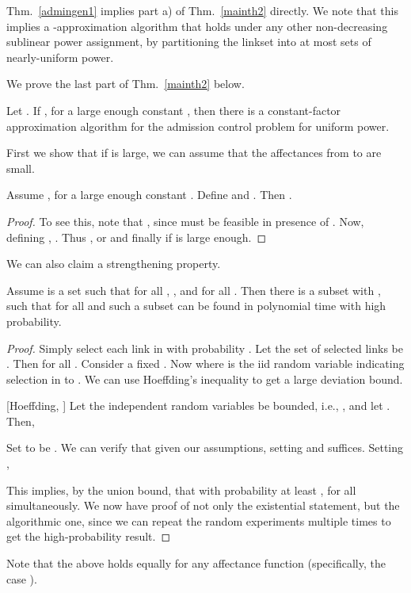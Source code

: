 \documentclass[11pt]{amsart}
\begin{document}
Thm.~\ref{admingen1} implies part a) of Thm.~\ref{mainth2} directly.
We note that this implies a -approximation 
algorithm that holds under any other
non-decreasing sublinear power assignment, by partitioning the
linkset into at most  sets of nearly-uniform power.


We prove the last part of Thm.~\ref{mainth2} below.
\begin{theorem}
Let .
If , for a large enough constant , then there is a constant-factor approximation algorithm for the admission control problem for uniform power.
\end{theorem}

First we show that if  is large, we can assume that the affectances from  to  are small.

\begin{lemma}
Assume , for a large enough constant . 
Define  and .
Then .
\label{lem:saffect}
\end{lemma}
\begin{proof}
To see this, note that , since  must be feasible in presence of . Now, defining , .
Thus , or  and finally  if  is large enough.
\end{proof}

We can also claim a strengthening property.
\begin{lemma}
Assume  is a set such that for all , , and  for all . Then there is a subset 
with ,
such that  for all  and such a subset can be found in polynomial time with high probability.
\label{lem:sparsify1}
\end{lemma}
\begin{proof}
Simply select each link in  with probability . Let the set of selected links be . Then
 for all . Consider a fixed . Now
 where  is the iid random variable indicating selection in to .
We can use Hoeffding's inequality to get a large deviation bound.

\begin{theorem}{[Hoeffding, \cite{hoeffding1963}]}
Let the independent random variables  be bounded, i.e., , and let . Then,

\end{theorem}

Set  to be . We can verify that given our assumptions, setting  and  suffices. Setting ,

This implies, by the union bound, that with probability at least ,  for all  simultaneously. We now have proof of not only the existential statement, but the algorithmic one, since we can repeat the random experiments multiple times to get the high-probability result. 
\end{proof}
Note that the above holds equally for any affectance function (specifically, the case ).
\end{document}
